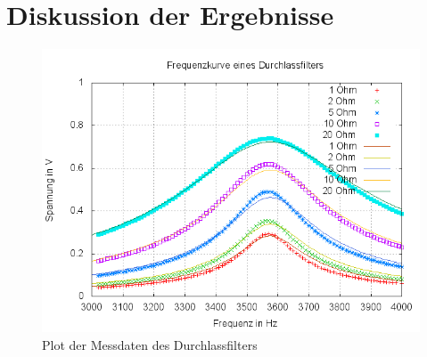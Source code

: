 \section{Diskussion der Ergebnisse}
\begin{figure}
	\includegraphics[width=\textwidth]{images/durchlassfilter+theorie+R_ges-fit}
\caption{Plot der Messdaten des Durchlassfilters}
\label{plot:durchlass+R_ges-fit}
\end{figure}